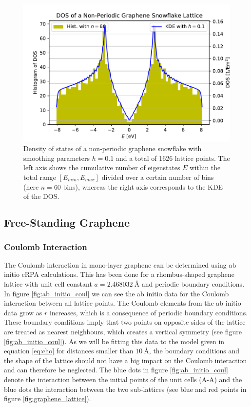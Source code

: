 \begin{figure}[H]
    \centering
    \includegraphics[width=.6\textwidth]{img/dos_snowflake.pdf}
    \caption{Density of states of a non-periodic graphene snowflake with smoothing parameters $h=0.1$ and a total of 1626 lattice points. The left axis shows the cumulative number of eigenstates $E$ within the total range $[E_{min},E_{max}]$ divided over a certain number of bins (here $n=60$ bins), whereas the right axis corresponds to the KDE of the DOS.}
    \label{fig:DOS_graphene}
\end{figure}


\subsection{Free-Standing Graphene}

\subsubsection{Coulomb Interaction}

The Coulomb interaction in mono-layer graphene can be determined using ab initio cRPA calculations. This has been done for a rhombus-shaped graphene lattice with unit cell constant $a = \SI{2.468032}{\angstrom}$ and periodic boundary conditions. In figure \ref{fig:ab_initio_coul} we can see the ab initio data for the Coulomb interaction between all lattice points. The Coulomb elements from the ab initio data grow as $r$ increases, which is a consequence of periodic boundary conditions. These boundary conditions imply that two points on opposite sides of the lattice are treated as nearest neighbours, which creates a vertical symmetry (see figure \ref{fig:ab_initio_coul}). As we will be fitting this data to the model given in equation \ref{eq:cho} for distances smaller than $\SI{10}{\angstrom}$, the boundary conditions and the shape of the lattice should not have a big impact on the Coulomb interaction and can therefore be neglected. The blue dots in figure \ref{fig:ab_initio_coul} denote the interaction between the initial points of the unit cells (A-A) and the blue dots the interaction between the two sub-lattices (see blue and red points in figure \ref{fig:graphene_lattice}).


